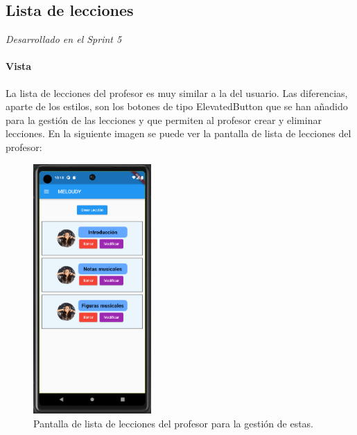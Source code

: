 \subsection{Lista de lecciones} 
\textit{Desarrollado en el Sprint 5}

\paragraph*{Vista}
La lista de lecciones del profesor es muy similar a la del usuario. Las diferencias, aparte de los estilos, son los botones de tipo ElevatedButton que se han añadido para la gestión de las lecciones y que permiten al profesor crear y eliminar lecciones. En la siguiente imagen se puede ver la pantalla de lista de lecciones del profesor:

\begin{figure}[H]
  \centering
  \includegraphics[width=0.4\textwidth]{imagenes/c7/listalecciones.png}
  \caption{Pantalla de lista de lecciones del profesor para la gestión de estas.} 
  \label{fig:login}
\end{figure}